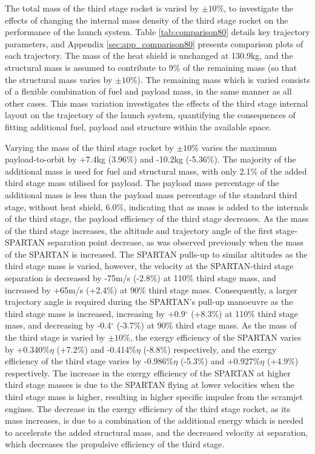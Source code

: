 The total mass of the third stage rocket is varied by $\pm10\%$, to investigate the effects of changing the internal mass density of the third stage rocket on the performance of the launch system. Table \ref{tab:comparison80} details key trajectory parameters, and Appendix \ref{sec:app_comparison80} presents comparison plots of each trajectory.
The mass of the heat shield is unchanged at 130.9kg, and the structural mass is assumed to contribute to 9\% of the remaining mass (so that the structural mass varies by $\pm10\%$). The remaining mass which is varied consists of a flexible combination of fuel and payload mass, in the same manner as all other cases. 
This mass variation investigates the effects of the third stage internal layout on the trajectory of the launch system, quantifying the consequences of fitting additional fuel, payload and structure within the available space.

Varying the mass of the third stage rocket by $\pm10\%$ varies the maximum payload-to-orbit by +7.4kg (3.96\%) and -10.2kg (-5.36\%). 
The majority of the additional mass is used for fuel and structural mass, with only 2.1\% of the added third stage mass utilised for payload. The payload mass percentage of the additional mass is less than the payload mass percentage of the standard third stage, without heat shield, 6.0\%, indicating that as mass is added to the internals of the third stage, the payload efficiency of the third stage decreases.
 As the mass of the third stage increases, the altitude and trajectory angle of the first stage-SPARTAN separation point decrease, as was observed previously when the mass of the SPARTAN is increased. 
 The SPARTAN pulls-up to similar altitudes as the third stage mass is varied, however, the velocity at the SPARTAN-third stage separation is decreased by -75m/s (-2.8\%) at 110\% third stage mass, and increased by +65m/s (+2.4\%) at 90\% third stage mass. 
 Consequently, a larger trajectory angle is required during the SPARTAN's pull-up manoeuvre as the third stage mass is increased, increasing by +0.9$^\circ$ (+8.3\%) at 110\% third stage mass, and decreasing by -0.4$^\circ$ (-3.7\%) at 90\% third stage mass. 
As the mass of the third stage is varied by $\pm10\%$, the exergy efficiency of the SPARTAN varies by +0.340\%$\eta$ (+7.2\%) and -0.414\%$\eta$ (-8.8\%) respectively, and the exergy efficiency of the third stage varies by -0.986\%$\eta$ (-5.3\%) and +0.927\%$\eta$ (+4.9\%) respectively. The increase in the exergy efficiency of the SPARTAN at higher third stage masses is due to the SPARTAN flying at lower velocities when the third stage mass is higher, resulting in higher specific impulse from the scramjet engines. 
The decrease in the exergy efficiency of the third stage rocket, as its mass increases, is due to a combination of the additional energy which is needed to accelerate the added structural mass, and the decreased velocity at separation, which decreases the propulsive efficiency of the third stage. 



